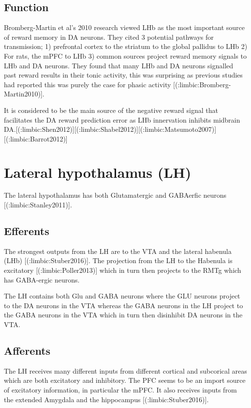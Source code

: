 {{\subsection{Function}

Bromberg-Martin et al’s 2010 research viewed LHb as the most important source of reward memory in DA neurons. They cited 3 potential pathways for transmission; 1) prefrontal cortex to the striatum to the global pallidus to LHb 2) For rats, the mPFC to LHb 3) common sources project reward memory signals to LHb and DA neurons. They found that many LHb and DA neurons signalled past reward results in their tonic activity, this was surprising as previous studies had reported this was purely the case for phasic activity [(:limbic:Bromberg-Martin2010)].

It is considered to be the main source of the negative reward signal that facilitates the DA reward prediction error as LHb innervation inhibits midbrain DA.[(:limbic:Shen2012)][(:limbic:Shabel2012)][(:limbic:Matsumoto2007)][(:limbic:Barrot2012)] 





\section{Lateral hypothalamus (LH)}

The lateral hypothalamus has both Glutamatergic and GABAerfic neurons [(:limbic:Stanley2011)].

\subsection{Efferents}

The strongest outputs from the LH are to the VTA and the lateral habenula (LHb) [(:limbic:Stuber2016)]. 
The projection from the LH to the Habenula is excitatory [(:limbic:Poller2013)] which in turn then projects to the RMTg which has GABA-ergic neurons.

The LH contains both Glu and GABA neurons where the GLU neurons project to the DA neurons in the VTA whereas the GABA neurons in the LH project to the GABA neurons in the VTA which in turn then disinhibit DA neurons in the VTA. 


\subsection{Afferents}

The LH receives many different inputs from different cortical and subcorical areas which are both excitatory and inhibitory. The PFC seems to be an import source of excitatory information, in particular the mPFC. It also receives inputs from the extended Amygdala and the hippocampus [(:limbic:Stuber2016)].

}}
